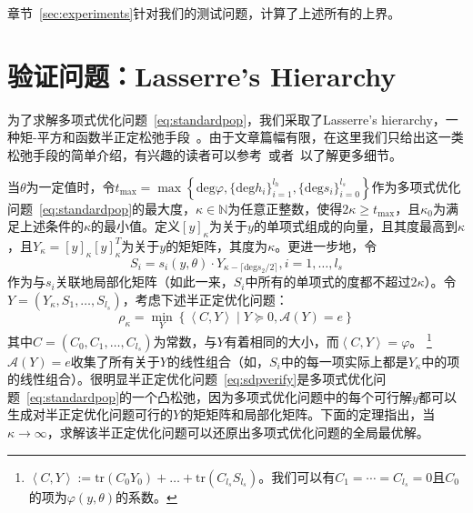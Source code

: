 章节~\ref{sec:experiments}针对我们的测试问题，计算了上述所有的上界。

\section{验证问题：Lasserre's Hierarchy}
\label{sec:sdpverify}

为了求解多项式优化问题~\eqref{eq:standardpop}，我们采取了Lasserre's hierarchy，一种矩-平方和函数半正定松弛手段~\cite{lasserre01siopt-global}。由于文章篇幅有限，在这里我们只给出这一类松弛手段的简单介绍，有兴趣的读者可以参考~\cite{lasserre01siopt-global}或者~\cite{yang22pami-certifiably}以了解更多细节。

当$\theta$为一定值时，令$t_{\max} = \max\left\{ \text{deg}\varphi, \{\text{deg} h_i\}_{i=1}^{l_h}, \{\text{deg}s_i\}_{i=0}^{l_s} \right\}$作为多项式优化问题~\eqref{eq:standardpop}的最大度，$\kappa \in \mathbb{N}$为任意正整数，使得$2 \kappa \ge t_{\max}$，且$\kappa_0$为满足上述条件的$\kappa$的最小值。定义$[y]_\kappa$为关于$y$的单项式组成的向量，且其度最高到$\kappa$，且$Y_\kappa = [y]_\kappa [y]_\kappa^T$为关于$y$的矩矩阵，其度为$\kappa$。更进一步地，令
\begin{equation}
    S_i = s_i(y, \theta) \cdot Y_{\kappa - \lceil \text{deg}s_2/2 \rceil}, i = 1, \dots, l_s
\end{equation}
作为与$s_i$关联地局部化矩阵（如此一来，$S_i$中所有的单项式的度都不超过$2\kappa$）。令$Y = \left( Y_\kappa, S_1, \dots, S_{l_s} \right)$，考虑下述半正定优化问题：
\begin{equation}\label{eq:sdpverify}
    \rho_\kappa = \min_{Y}\left\{ \left< C, Y \right> \mid Y \succeq 0, \mathcal{A}(Y) = e \right\}
\end{equation}
其中$C = (C_0, C_1, \dots, C_{l_s})$为常数，与$Y$有着相同的大小，而$\left< C, Y \right> = \varphi$。
\footnote{$\left< C, Y \right> := \text{tr}(C_0 Y_0) + \dots + \text{tr}(C_{l_s} S_{l_s})$。我们可以有$C_1 = \cdots = C_{l_s} = 0$且$C_0$的项为$\varphi(y, \theta)$的系数。}
$\mathcal{A}(Y) = e$收集了所有关于$Y$的线性组合（如，$S_i$中的每一项实际上都是$Y_\kappa$中的项的线性组合）。很明显半正定优化问题~\eqref{eq:sdpverify}是多项式优化问题~\eqref{eq:standardpop}的一个凸松弛，因为多项式优化问题中的每个可行解$y$都可以生成对半正定优化问题可行的$Y$的矩矩阵和局部化矩阵。下面的定理指出，当$\kappa \rightarrow \infty$，求解该半正定优化问题可以还原出多项式优化问题的全局最优解。

